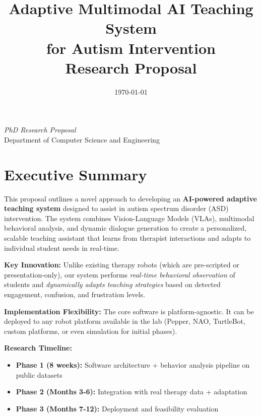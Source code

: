 \documentclass[12pt, a4paper]{article}
\title{
    \textbf{\color{darkblue}Adaptive Multimodal AI Teaching System} \\
    \textbf{\color{darkblue}for Autism Intervention}
    \\[0.5in]
    \large{Research Proposal}
}
\author{}
\date{\today}
\begin{document}
\maketitle

\begin{center}
    \textit{PhD Research Proposal} \\
    Department of Computer Science and Engineering \\
    [Your Institution]
\end{center}

\newpage
\tableofcontents
\newpage

\section{Executive Summary}

This proposal outlines a novel approach to developing an \textbf{AI-powered adaptive teaching system} designed to assist in autism spectrum disorder (ASD) intervention. The system combines Vision-Language Models (VLAs), multimodal behavioral analysis, and dynamic dialogue generation to create a personalized, scalable teaching assistant that learns from therapist interactions and adapts to individual student needs in real-time.

\textbf{Key Innovation:} Unlike existing therapy robots (which are pre-scripted or presentation-only), our system performs \textit{real-time behavioral observation} of students and \textit{dynamically adapts teaching strategies} based on detected engagement, confusion, and frustration levels.

\textbf{Implementation Flexibility:} The core software is platform-agnostic. It can be deployed to any robot platform available in the lab (Pepper, NAO, TurtleBot, custom platforms, or even simulation for initial phases).

\textbf{Research Timeline:} 
\begin{itemize}
    \item \textbf{Phase 1 (8 weeks):} Software architecture + behavior analysis pipeline on public datasets
    \item \textbf{Phase 2 (Months 3-6):} Integration with real therapy data + adaptation
    \item \textbf{Phase 3 (Months 7-12):} Deployment and feasibility evaluation
\end{itemize}
\end{document}
